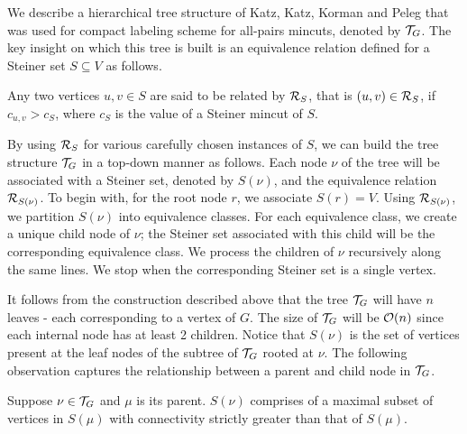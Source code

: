 We describe a hierarchical tree structure of Katz, Katz, Korman and Peleg \cite{DBLP:journals/siamcomp/KatzKKP04}
that was used for compact labeling scheme for all-pairs mincuts, denoted by ${\cal T}_G$. The key insight on which this tree is built is an equivalence relation defined for a Steiner set $S\subseteq V$ as follows.


\begin{definition}
Any two vertices $u,v\in S$ are said to be related by ${\cal R}_S$, that is $(u,v)\in {\cal R}_S$, if
$c_{u,v}>c_S$, where $c_S$ is the value of a Steiner mincut of $S$.
\end{definition}



By using ${\cal R}_S$ for various carefully chosen instances of $S$, we can build the tree structure ${\cal T}_G$ in a top-down manner as follows. Each node $\nu$ of the tree will be associated with a Steiner set, denoted by $S(\nu)$, and the equivalence relation ${\cal R}_{S(\nu)}$. To begin with, for the root node $r$, we associate $S(r)=V$.
Using ${\cal  R}_{S(\nu)}$, we partition $S(\nu)$ into equivalence classes. For each equivalence class, we create a unique child node of $\nu$; the Steiner set associated with this child will be the corresponding equivalence class. We process the children of $\nu$ recursively along the same lines. We stop when the corresponding Steiner set is a single vertex. 

It follows from the construction described above that the tree ${\cal T}_G$ will have $n$ leaves - each corresponding to a vertex of $G$. The size of ${\cal T}_G$ will be ${\cal O}(n)$ since each internal node has at least 2 children. Notice that $S(\nu)$ is the set of vertices present at the leaf nodes of the subtree of ${\cal T}_G$ rooted at $\nu$. The following observation captures the relationship between a parent and child node in 
${\cal T}_G$.

\begin{observation}
\label{obs:maximal-subset-subtree}
Suppose $\nu \in {\cal T}_G$ and $\mu$ is its parent. $S(\nu)$ comprises of a maximal subset of vertices in $S(\mu)$ with connectivity strictly greater than that of $S(\mu)$.
\end{observation}

